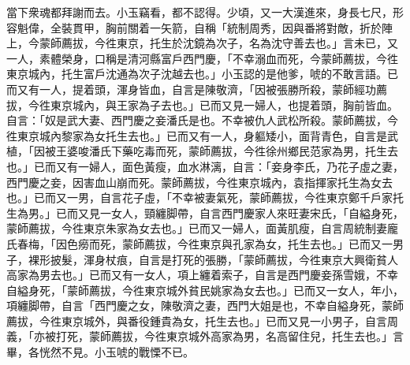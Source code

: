 當下衆魂都拜謝而去。小玉竊看，都不認得。{}少頃，又一大漢進來，身長七尺，形容魁偉，全裝貫甲，胸前關着一矢箭，自稱「統制周秀，因與番將對敵，折於陣上，今蒙師薦拔，今徃東京，托生於沈鏡為次子，名為沈守善去也。」言未已，又一人，素體榮身，口稱是清河縣富戶西門慶，「不幸溺血而死，今蒙師薦拔，今徃東京城內，托生富戶沈通為次子沈越去也。」小玉認的是他爹，唬的不敢言語。已而又有一人，提着頭，渾身皆血，自言是陳敬濟，「因被張勝所殺，蒙師經功薦拔，今徃東京城內，與王家為子去也。」已而又見一婦人，也提着頭，胸前皆血。自言：「奴是武大妻、西門慶之妾潘氏是也。不幸被仇人武松所殺。蒙師薦拔，今徃東京城內黎家為女托生去也。」已而又有一人，身軀矮小，面背青色，自言是武植，「因被王婆唆潘氏下藥吃毒而死，蒙師薦拔，今徃徐州鄉民范家為男，托生去也。」{}已而又有一婦人，面色黃瘦，血水淋漓，自言：「妾身李氏，乃花子虛之妻，西門慶之妾，因害血山崩而死。蒙師薦拔，今徃東京城內，袁指揮家托生為女去也。」已而又一男，自言花子虛，「不幸被妻氣死，蒙師薦拔，今徃東京鄭千戶家托生為男。」已而又見一女人，頸纏脚帶，自言西門慶家人來旺妻宋氏，「自縊身死，蒙師薦拔，今徃東京朱家為女去也。」已而又一婦人，面黃肌瘦，自言周統制妻龐氏春梅，「因色癆而死，蒙師薦拔，今徃東京與孔家為女，托生去也。」已而又一男子，裸形披髮，渾身杖痕，自言是打死的張勝，「蒙師薦拔，今徃東京大興衛貧人高家為男去也。」已而又有一女人，項上纏着索子，自言是西門慶妾孫雪娥，不幸自縊身死，「蒙師薦拔，今徃東京城外貧民姚家為女去也。」已而又一女人，年小，項纏脚帶，自言「西門慶之女，陳敬濟之妻，西門大姐是也，不幸自縊身死，蒙師薦拔，今徃東京城外，與番役鍾貴為女，托生去也。」已而又見一小男子，自言周義，「亦被打死，蒙師薦拔，今徃東京城外高家為男，名高留住兒，托生去也。」言畢，各恍然不見。小玉唬的戰慄不已。

